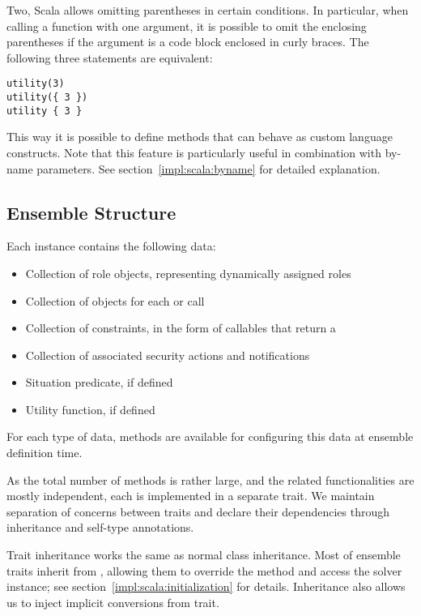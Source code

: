 Two, Scala allows omitting parentheses in certain conditions. In particular, when
calling a function with one argument, it is possible to omit the enclosing parentheses
if the argument is a code block enclosed in curly braces. The following three statements
are equivalent:

\begin{lstlisting}[style=snippet]
utility(3)
utility({ 3 })
utility { 3 }
\end{lstlisting}

This way it is possible to define methods that can behave as custom language constructs.
Note that this feature is particularly useful in combination with by-name parameters.
See section~\ref{impl:scala:byname} for detailed explanation.



\subsection{Ensemble Structure}
\label{impl:scala:ensemble}

Each  instance contains the following data:
\begin{itemize}
    \item Collection of role objects, representing dynamically assigned roles
    \item Collection of  objects for each  or 
    call
    \item Collection of constraints, in the form of callables that return a 
    \item Collection of associated security actions and notifications
    \item Situation predicate, if defined
    \item Utility function, if defined
\end{itemize}

For each type of data, methods are available for configuring this data at ensemble
definition time.

As the total number of methods is rather large, and the related functionalities are
mostly independent, each is implemented in a separate trait. We maintain separation of
concerns between traits and declare their dependencies through inheritance and self-type
annotations.

Trait inheritance works the same as normal class inheritance. Most of ensemble traits
inherit from , allowing them to override the  method and
access the solver instance; see section~\ref{impl:scala:initialization} for details.
Inheritance also allows us to inject implicit conversions from 
trait.

